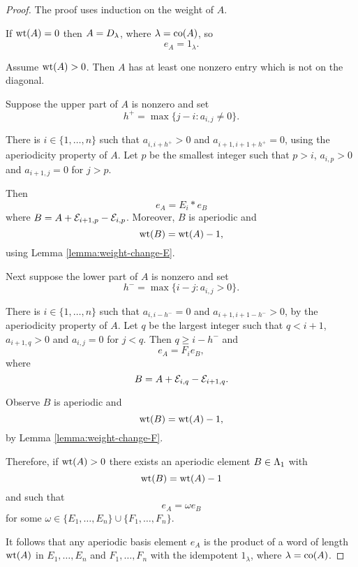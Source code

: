 \documentclass[a4paper, 11pt]{report}
\begin{document}
\begin{proof}
The proof uses induction on the weight of $A$.

If $\operatorname{wt}(A)=0$ then $A=D_{\lambda}$, where $\lambda=\operatorname{co}(A)$, so
\begin{equation*}
e_A = 1_\lambda.
\end{equation*}

Assume $\operatorname{wt}(A)>0$. Then $A$ has at least one nonzero entry which is not on the diagonal.

Suppose the upper part of $A$ is nonzero and set
\begin{equation*}
h^+ = \max\{j-i:a_{i,j}\neq 0\}.
\end{equation*}

There is $i\in\{1,\ldots,n\}$ such that $a_{i,i+h^{+}}>0$ and $a_{i+1,i+1+h^{+}}=0$, using the aperiodicity property of $A$. Let $p$ be the smallest integer such that $p>i$, $a_{i,p}>0$ and $a_{i+1,j}=0$ for $j>p$.

Then
\begin{equation*}
e_A = E_i\ast e_B
\end{equation*}
where $B=A+\mathcal{E}_{i+1,p} -\mathcal{E}_{i,p}$. Moreover, $B$ is aperiodic and
\begin{equation*}
\operatorname{wt}(B) = \operatorname{wt}(A)-1,
\end{equation*}
using Lemma \ref{lemma:weight-change-E}.

Next suppose the lower part of $A$ is nonzero and set
\begin{equation*}
h^- = \max\{i-j:a_{i,j}>0\}.
\end{equation*}

There is $i\in\{1,\ldots,n\}$ such that $a_{i,i-h^{-}}=0$ and $a_{i+1,i+1-h^{-}}>0$, by the aperiodicity property of $A$. Let $q$ be the largest integer such that $q<i+1$, $a_{i+1,q}>0$ and $a_{i,j}=0$ for $j<q$. Then $q\geq i-h^{-}$ and
\begin{equation*}
e_A = F_i e_B,
\end{equation*}
where
\begin{equation*}
B = A + \mathcal{E}_{i,q} - \mathcal{E}_{i+1,q}.
\end{equation*}

Observe $B$ is aperiodic and
\begin{equation*}
\operatorname{wt}(B) = \operatorname{wt}(A)-1,
\end{equation*}
by Lemma \ref{lemma:weight-change-F}.

Therefore, if $\operatorname{wt}(A)>0$ there exists an aperiodic element $B\in\Lambda_1{}$ with
\begin{equation*}
\operatorname{wt}(B) = \operatorname{wt}(A) - 1
\end{equation*}
and such that
\begin{equation*}
e_A = \omega e_B
\end{equation*}
for some $\omega\in\{E_1,\ldots,E_n\}\cup\{F_1,\ldots,F_n\}$.

It follows that any aperiodic basis element $e_A$ is the product of a word of length $\operatorname{wt}(A)$ in $E_1,\ldots,E_n$ and $F_1,\ldots,F_n$ with the idempotent $1_\lambda$, where $\lambda=\operatorname{co}(A)$.
\end{proof}
\end{document}
